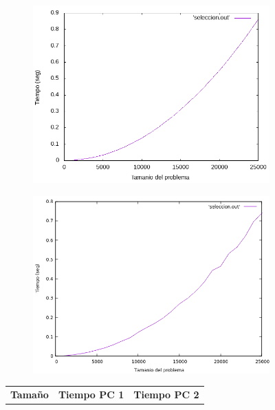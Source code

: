 \documentclass[12pt,spanish]{article}
\begin{document}
\begin{figure}[H]
\centering
\begin{subfigure}[b]{0.45\textwidth}
\includegraphics[scale=0.45]{empirica_seleccion.png}
\caption{}
\end{subfigure}
\quad
\begin{subfigure}[b]{0.45\textwidth}
\includegraphics[scale=0.45]{empirica_seleccion_2.png}
\caption{}
\end{subfigure}
\newline
\newline
\begin{tabular}{|c|c|c|}
\hline
\textbf{Tamaño} & \textbf{Tiempo PC 1} & \textbf{Tiempo PC 2} \\

\end{tabular}
\end{figure}
\end{document}
